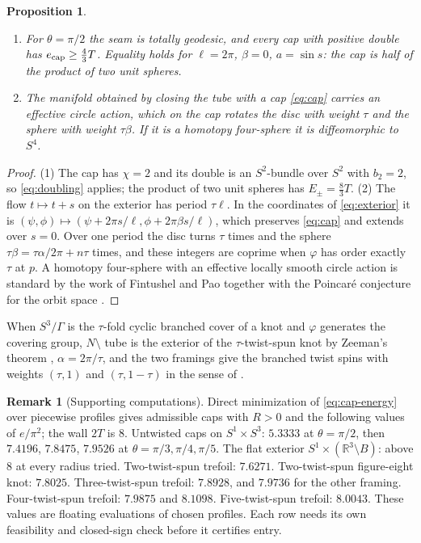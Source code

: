 \documentclass[11pt,letterpaper]{article}
\numberwithin{equation}{section}
\newtheorem{proposition}[theorem]{Proposition}
\theoremstyle{definition}
\newtheorem{remark}[theorem]{Remark}
\begin{document}
\begin{proposition}\label{prop:tube-bounds}
\begin{enumerate}
\item For \(\theta=\pi/2\) the seam is totally geodesic, and every cap
with positive double has \(e_{\rm cap}\ge\tfrac43T\). Equality holds for
\(\ell=2\pi\), \(\beta=0\), \(a=\sin s\): the cap is half of the product
of two unit spheres.
\item The manifold obtained by closing the tube with a cap
\eqref{eq:cap} carries an effective circle action, which on the cap rotates
the disc with weight \(\tau\) and the sphere with weight \(\tau\beta\). If it
is a homotopy four-sphere it is diffeomorphic to \(S^4\).
\end{enumerate}
\end{proposition}
\begin{proof}
(1) The cap has \(\chi=2\) and its double is an \(S^2\)-bundle over
\(S^2\) with \(b_2=2\), so \eqref{eq:doubling} applies; the product of two
unit spheres has \(E_\pm=\tfrac83T\). (2) The flow \(t\mapsto t+s\) on the
exterior has period \(\tau\ell\). In the coordinates of \eqref{eq:exterior}
it is \((\psi,\phi)\mapsto(\psi+2\pi s/\ell,\phi+2\pi\beta s/\ell)\), which
preserves \eqref{eq:cap} and extends over \(s=0\). Over one period the
disc turns \(\tau\) times and the sphere \(\tau\beta=\tau\alpha/2\pi+n\tau\)
times, and these integers are coprime when \(\varphi\) has order exactly
\(\tau\) at \(p\). A homotopy four-sphere with an effective locally smooth
circle action is standard by the work of Fintushel and Pao
\cite{Fintushel1976Circle,Pao1978Nonlinear} together with the Poincar\'e
conjecture for the orbit space \cite{Perelman2003Surgery}.
\end{proof}

When \(S^3/\Gamma\) is the \(\tau\)-fold cyclic branched cover of a knot
and \(\varphi\) generates the covering group, \(N\setminus\) tube is the
exterior of the \(\tau\)-twist-spun knot by Zeeman's theorem
\cite{Zeeman1965Twisting}, \(\alpha=2\pi/\tau\), and the two framings give
the branched twist spins with weights \((\tau,1)\) and \((\tau,1-\tau)\)
in the sense of \cite{Fukuda2018Gluck}.

\begin{remark}[Supporting computations]\label{rem:numerics}
Direct minimization of \eqref{eq:cap-energy} over piecewise profiles gives
admissible caps with \(R>0\) and the following values of \(e/\pi^2\); the
wall \(2T\) is \(8\). Untwisted caps on \(S^1\times S^3\):
\(5.3333\) at \(\theta=\pi/2\), then \(7.4196\), \(7.8475\), \(7.9526\) at
\(\theta=\pi/3,\pi/4,\pi/5\). The flat exterior
\(S^1\times(\mathbb R^3\setminus B)\): above \(8\) at every radius tried.
Two-twist-spun trefoil: \(7.6271\). Two-twist-spun figure-eight knot:
\(7.8025\). Three-twist-spun trefoil: \(7.8928\), and \(7.9736\) for the
other framing. Four-twist-spun trefoil: \(7.9875\) and \(8.1098\).
Five-twist-spun trefoil: \(8.0043\). These values are floating
evaluations of chosen profiles. Each row needs its own feasibility and
closed-sign check before it certifies entry.
\end{remark}
\end{document}
